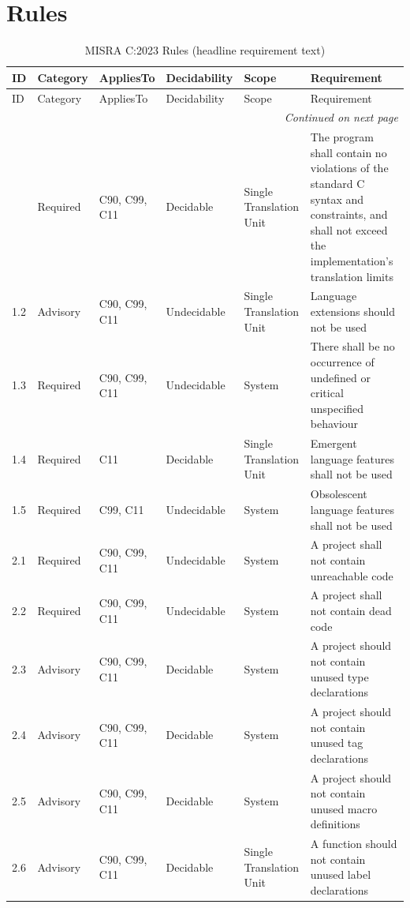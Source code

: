 \documentclass[11pt]{article}
\begin{document}
\section{Rules}
{\footnotesize\setlength{\tabcolsep}{2pt}\renewcommand{\arraystretch}{1.05}%
\begin{longtable}{@{}p{1.0cm}p{1.6cm}p{1.8cm}p{2.0cm}p{1.6cm}p{7.4cm}@{}}
\caption{MISRA C:2023 Rules (headline requirement text)}\\
\toprule
ID & Category & AppliesTo & Decidability & Scope & Requirement \\
\midrule
\endfirsthead
\toprule
ID & Category & AppliesTo & Decidability & Scope & Requirement \\
\midrule
\endhead
\midrule
\multicolumn{6}{r}{\emph{Continued on next page}} \\
\midrule
\endfoot
\bottomrule
\endlastfoot
1.1 & Required & C90, C99, C11 & Decidable & Single Translation Unit & The program shall contain no violations of the standard C syntax and constraints, and shall not exceed the implementation's translation limits \\
1.2 & Advisory & C90, C99, C11 & Undecidable & Single Translation Unit & Language extensions should not be used \\
1.3 & Required & C90, C99, C11 & Undecidable & System & There shall be no occurrence of undefined or critical unspecified behaviour \\
1.4 & Required & C11 & Decidable & Single Translation Unit & Emergent language features shall not be used \\
1.5 & Required & C99, C11 & Undecidable & System & Obsolescent language features shall not be used \\
2.1 & Required & C90, C99, C11 & Undecidable & System & A project shall not contain unreachable code \\
2.2 & Required & C90, C99, C11 & Undecidable & System & A project shall not contain dead code \\
2.3 & Advisory & C90, C99, C11 & Decidable & System & A project should not contain unused type declarations \\
2.4 & Advisory & C90, C99, C11 & Decidable & System & A project should not contain unused tag declarations \\
2.5 & Advisory & C90, C99, C11 & Decidable & System & A project should not contain unused macro definitions \\
2.6 & Advisory & C90, C99, C11 & Decidable & Single Translation Unit & A function should not contain unused label declarations \\

\end{longtable}}
\end{document}

